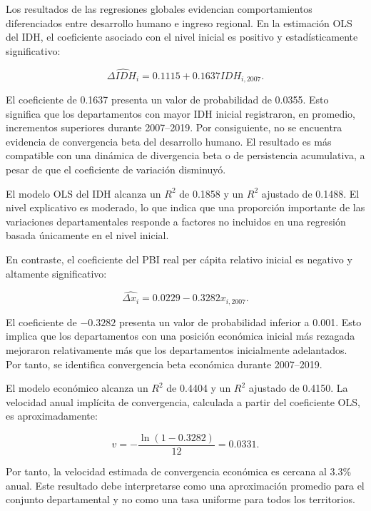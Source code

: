 Los resultados de las regresiones globales evidencian comportamientos
diferenciados entre desarrollo humano e ingreso regional. En la estimación
OLS del IDH, el coeficiente asociado con el nivel inicial es positivo y
estadísticamente significativo:

\begin{equation}
\widehat{\Delta IDH_i}
=
0.1115
+
0.1637 IDH_{i,2007}.
\end{equation}

El coeficiente de 0.1637 presenta un valor de probabilidad de 0.0355. Esto
significa que los departamentos con mayor IDH inicial registraron, en promedio,
incrementos superiores durante 2007--2019. Por consiguiente, no se encuentra
evidencia de convergencia beta del desarrollo humano. El resultado es más
compatible con una dinámica de divergencia beta o de persistencia acumulativa,
a pesar de que el coeficiente de variación disminuyó.

El modelo OLS del IDH alcanza un $R^2$ de 0.1858 y un $R^2$ ajustado de
0.1488. El nivel explicativo es moderado, lo que indica que una proporción
importante de las variaciones departamentales responde a factores no incluidos
en una regresión basada únicamente en el nivel inicial.

En contraste, el coeficiente del PBI real per cápita relativo inicial es
negativo y altamente significativo:

\begin{equation}
\widehat{\Delta x_i}
=
0.0229
-
0.3282 x_{i,2007}.
\end{equation}

El coeficiente de $-0.3282$ presenta un valor de probabilidad inferior a
0.001. Esto implica que los departamentos con una posición económica inicial
más rezagada mejoraron relativamente más que los departamentos inicialmente
adelantados. Por tanto, se identifica convergencia beta económica durante
2007--2019.

El modelo económico alcanza un $R^2$ de 0.4404 y un $R^2$ ajustado de 0.4150.
La velocidad anual implícita de convergencia, calculada a partir del coeficiente
OLS, es aproximadamente:

\begin{equation}
v
=
-\frac{\ln(1-0.3282)}{12}
=
0.0331.
\end{equation}

Por tanto, la velocidad estimada de convergencia económica es cercana al
3.3\% anual. Este resultado debe interpretarse como una aproximación promedio
para el conjunto departamental y no como una tasa uniforme para todos los
territorios.

